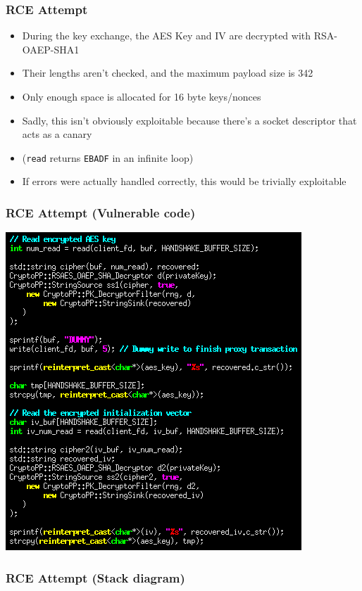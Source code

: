 \documentclass{beamer}
\begin{document}
\begin{frame}[fragile]
\frametitle{RCE Attempt}
\begin{itemize}
\item During the key exchange, the AES Key and IV are decrypted with RSA-OAEP-SHA1
\item Their lengths aren't checked, and the maximum payload size is 342
\item Only enough space is allocated for 16 byte keys/nonces
\item Sadly, this isn't obviously exploitable because there's a socket descriptor that acts as a canary
\item (\verb|read| returns \verb|EBADF| in an infinite loop)
\item If errors were actually handled correctly, this would be trivially exploitable
\end{itemize}
\end{frame}
\begin{frame}[fragile]
\frametitle{RCE Attempt (Vulnerable code)}
\includegraphics[height=0.8\textheight]{bankscreenshot_cropped.png}
\end{frame}

\begin{frame}[fragile]
\frametitle{RCE Attempt (Stack diagram)}
\begin{tikzpicture}[scale=0.4, every node/.style={scale=0.4}]

\end{tikzpicture}
\end{frame}
\end{document}
